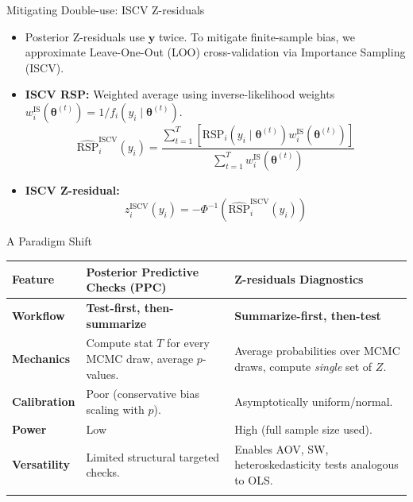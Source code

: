 \documentclass[
  ignorenonframetext,
]{beamer}
\newcounter{none} %
\providecommand{\tightlist}{%
  \setlength{\itemsep}{0pt}\setlength{\parskip}{0pt}}
\begin{document}
\begin{frame}{Mitigating Double-use: ISCV Z-residuals}
\protect{}\label{mitigating-double-use-iscv-z-residuals}
\begin{itemize}
\tightlist
\item
  Posterior Z-residuals use \(\mathbf{y}\) twice. To mitigate
  finite-sample bias, we approximate Leave-One-Out (LOO)
  cross-validation via Importance Sampling (ISCV).
\item
  \textbf{ISCV RSP:} Weighted average using inverse-likelihood weights
  \(w_i^{\text{IS}}(\boldsymbol{\theta}^{(t)}) = 1 / f_i(y_i \mid \boldsymbol{\theta}^{(t)})\).
  \[ \widehat{\text{RSP}}_i^{\text{ISCV}}(y_i) = \frac{\sum_{t=1}^T \left[ \text{RSP}_i(y_i \mid \boldsymbol{\theta}^{(t)}) w_i^{\text{IS}}(\boldsymbol{\theta}^{(t)}) \right]}{\sum_{t=1}^T w_i^{\text{IS}}(\boldsymbol{\theta}^{(t)})} \]
\item
  \textbf{ISCV Z-residual:}
  \[ z_i^{\text{ISCV}}(y_i) = -\Phi^{-1}\left(\widehat{\text{RSP}}_i^{\text{ISCV}}(y_i)\right) \]
\end{itemize}
\end{frame}

\begin{frame}{A Paradigm Shift}
\protect{}\label{a-paradigm-shift}
{\def\LTcaptype{none} %
\begin{longtable}[]{@{}
  >{\raggedright\arraybackslash}p{}
  >{\raggedright\arraybackslash}p{}
  >{\raggedright\arraybackslash}p{}@{}}
\toprule\noalign{}
\begin{minipage}[b]{\linewidth}\raggedright
Feature
\end{minipage} & \begin{minipage}[b]{\linewidth}\raggedright
Posterior Predictive Checks (PPC)
\end{minipage} & \begin{minipage}[b]{\linewidth}\raggedright
Z-residuals Diagnostics
\end{minipage} \\
\midrule\noalign{}
\endhead
\textbf{Workflow} & \textbf{Test-first, then-summarize} &
\textbf{Summarize-first, then-test} \\
\textbf{Mechanics} & Compute stat \(T\) for every MCMC draw, average
\(p\)-values. & Average probabilities over MCMC draws, compute
\emph{single} set of \(Z\). \\
\textbf{Calibration} & Poor (conservative bias scaling with \(p\)). &
Asymptotically uniform/normal. \\
\textbf{Power} & Low & High (full sample size used). \\
\textbf{Versatility} & Limited structural targeted checks. & Enables
AOV, SW, heteroskedasticity tests analogous to OLS. \\
\bottomrule\noalign{}
\end{longtable}
}
\end{frame}
\end{document}

